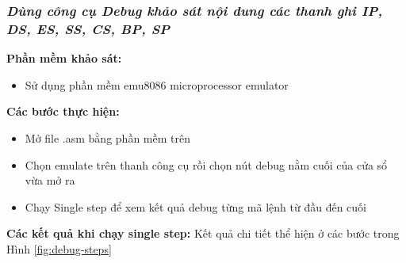 \subsubsection{\textit{Dùng công cụ Debug khảo sát nội dung các thanh ghi IP, DS, ES, SS, CS, BP, SP}}

\noindent\textbf{\large Phần mềm khảo sát:} 
\begin{itemize}
    \item Sử dụng phần mềm emu8086 microprocessor emulator
\end{itemize}

\vspace{0.3cm}

\noindent\textbf{\large Các bước thực hiện:} 
\begin{itemize}
    \item Mở file .asm bằng phần mềm trên
    \item Chọn emulate trên thanh công cụ rồi chọn nút debug nằm cuối của cửa sổ vừa mở ra 
    \item Chạy Single step để xem kết quả debug từng mã lệnh từ đầu đến cuối
\end{itemize}

\vspace{0.3cm}

\noindent\textbf{\large Các kết quả khi chạy single step:} Kết quả chi tiết thể hiện ở các bước trong Hình \ref{fig:debug-steps}

